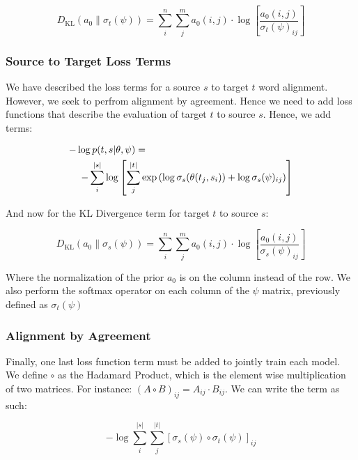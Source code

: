 \documentclass[twoside,twocolumn]{article}
\begin{document}
\begin{equation}
  D_{\mathrm{KL}} ( a_0 \| \sigma_t(\psi) ) = \sum_i^n \sum_j^m a_0(i, j) \cdot \log \left[ \frac{a_0(i, j)}{\sigma_t(\psi)_{ij}} \right]
\end{equation}



\subsubsection{Source to Target Loss Terms}
We have described the loss terms for a source $s$ to target $t$ word alignment. However, we seek to perfrom alignment by agreement. Hence we need to add loss functions that describe the evaluation of target $t$ to source $s$. Hence, we add terms:

\begin{equation}
  \centering
  \begin{split}
  -\log  p(t & , s | \theta, \psi) = \\
  - \sum_i^{|s|} & \log \left[ \sum_j^{|t|} \exp \left( \log \sigma_s(\theta(t_j, s_i)) + \log \sigma_s(\psi)_{ij} \right) \right]
\end{split}
\end{equation}

And now for the KL Divergence term for target $t$ to source $s$:

\begin{equation}
  D_{\mathrm{KL}} ( a_0 \| \sigma_s(\psi) ) = \sum_i^n \sum_j^m a_0(i, j) \cdot \log \left[ \frac{a_0(i, j)}{\sigma_s(\psi)_{ij}} \right]
\end{equation}

Where the normalization of the prior $a_0$ is on the column instead of the row. We also perform the softmax operator on each column of the $\psi$ matrix, previously defined as $\sigma_t(\psi)$

\subsubsection{Alignment by Agreement}
Finally, one last loss function term must be added to jointly train each model. We define $\circ$ as the Hadamard Product, which is the element wise multiplication of two matrices. For instance: $(A \circ B)_{ij} = A_{ij} \cdot B_{ij}$. We can write the term as such:

\begin{equation}
  -\log \sum_i^{|s|} \sum_j^{|t|} \left[ \sigma_s(\psi) \circ \sigma_t(\psi) \right]_{ij}
\end{equation}
\end{document}
